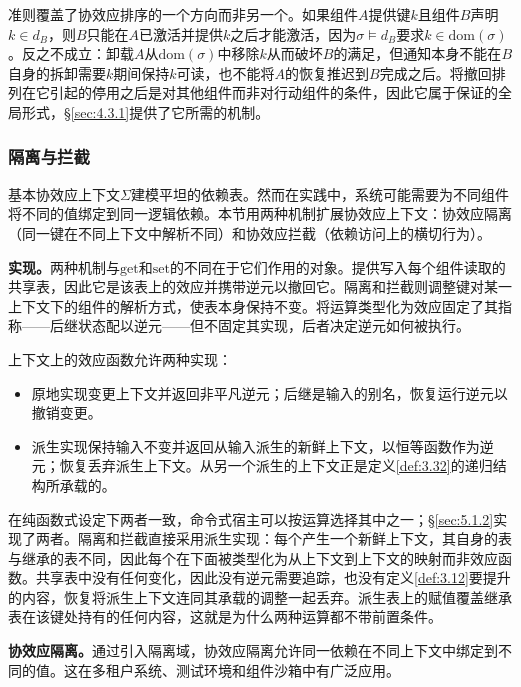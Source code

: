 准则覆盖了协效应排序的一个方向而非另一个。如果组件$A$提供键$k$且组件$B$声明$k \in d_B$，则$B$只能在$A$已激活并提供$k$之后才能激活，因为$\sigma \models d_B$要求$k \in \mathrm{dom}(\sigma)$。反之不成立：卸载$A$从$\mathrm{dom}(\sigma)$中移除$k$从而破坏$B$的满足，但通知本身不能在$B$自身的拆卸需要$k$期间保持$k$可读，也不能将$A$的恢复推迟到$B$完成之后。将撤回排列在它引起的停用之后是对其他组件而非对行动组件的条件，因此它属于保证的全局形式，\S\ref{sec:4.3.1}提供了它所需的机制。

\subsubsection{隔离与拦截}\label{subsubsec:3.2.3}

基本协效应上下文$\Sigma$建模平坦的依赖表。然而在实践中，系统可能需要为不同组件将不同的值绑定到同一逻辑依赖。本节用两种机制扩展协效应上下文：协效应隔离（同一键在不同上下文中解析不同）和协效应拦截（依赖访问上的横切行为）。

\textbf{实现。}两种机制与$\mathrm{get}$和$\mathrm{set}$的不同在于它们作用的对象。提供写入每个组件读取的共享表，因此它是该表上的效应并携带逆元以撤回它。隔离和拦截则调整键对某一上下文下的组件的解析方式，使表本身保持不变。将运算类型化为效应固定了其指称——后继状态配以逆元——但不固定其实现，后者决定逆元如何被执行。

\begin{definition}\label{def:3.27}
上下文上的效应函数允许两种实现：
\begin{itemize}
\item 原地实现变更上下文并返回非平凡逆元；后继是输入的别名，恢复运行逆元以撤销变更。
\item 派生实现保持输入不变并返回从输入派生的新鲜上下文，以恒等函数作为逆元；恢复丢弃派生上下文。从另一个派生的上下文正是定义\ref{def:3.32}的递归结构所承载的。
\end{itemize}
\end{definition}

在纯函数式设定下两者一致，命令式宿主可以按运算选择其中之一；\S\ref{sec:5.1.2}实现了两者。隔离和拦截直接采用派生实现：每个产生一个新鲜上下文，其自身的表与继承的表不同，因此每个在下面被类型化为从上下文到上下文的映射而非效应函数。共享表中没有任何变化，因此没有逆元需要追踪，也没有定义\ref{def:3.12}要提升的内容，恢复将派生上下文连同其承载的调整一起丢弃。派生表上的赋值覆盖继承表在该键处持有的任何内容，这就是为什么两种运算都不带前置条件。

\textbf{协效应隔离。}通过引入隔离域，协效应隔离允许同一依赖在不同上下文中绑定到不同的值。这在多租户系统、测试环境和组件沙箱中有广泛应用。

